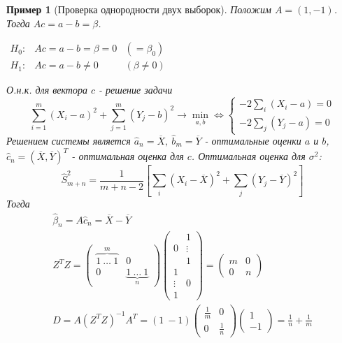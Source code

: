 \documentclass[12pt]{article}
\newtheorem*{example}{Пример}
\theoremstyle{basic_theorem}
\theoremstyle{name_theorem}
\begin{document}
\begin{example}[Проверка однородности двух выборок]
Положим $A=(1, -1)$. Тогда $Ac=a-b=\beta$.

$\begin{array}{ccc}
    H_0:& Ac=a-b=\beta=0& (=\beta_0)\\
    H_1:& Ac=a-b\neq0& (\beta\neq0)
\end{array}$

О.н.к. для вектора $c$ - решение задачи
\[
    \sum_{i=1}^m(X_i-a)^2+\sum_{j=1}^m(Y_j-b)^2\rightarrow \min_{a, b}
    \Leftrightarrow \begin{cases}
        -2\sum_i(X_i-a) = 0 \\
        -2\sum_j(Y_j-a) = 0
    \end{cases}
\]
Решением системы является $\widehat{a}_n=\overline{X},\ \widehat{b}_m=\overline{Y}$ -
оптимальные оценки $a$ и $b$, $\widehat{c}_n=(\overline{X}, \overline{Y})^T$ - оптимальная
оценка для $c$. Оптимальная оценка для $\sigma^2$:
\[ \widehat{S}^2_{m+n}=\frac{1}{m+n-2}\left[\sum_i(X_i-\overline{X})^2+\sum_j(Y_j-\overline{Y})^2\right] \]
Тогда
\[
\begin{array}{l}
    \widehat{\beta}_n=A\widehat{c}_n=\overline{X}-\overline{Y} \\
    Z^TZ=\left(\begin{array}{cc}
        \overbrace{1\ \ldots\ 1}^m & 0 \\
                0      & \underbrace{1\ \ldots\ 1}_n
    \end{array}\right)
    \left(\begin{array}{cc}
            & 1 \\
        0 & \vdots \\
            & 1 \\
        1  & \\
        \vdots & 0 \\
        1  &
    \end{array}\right) = \left(\begin{array}{cc}
        m & 0 \\
        0 & n
    \end{array}\right) \\
    D=A(Z^TZ)^{-1}A^T=
    \left(1\ -1 \right)
    \left(\begin{array}{cc}
        \frac{1}{m} & 0 \\
        0 & \frac{1}{n}
    \end{array}\right)
    \left(\begin{array}{c}
        1 \\
        -1
    \end{array}\right) = \frac{1}{n} + \frac{1}{m}

\end{array}\]
\end{example}
\end{document}
